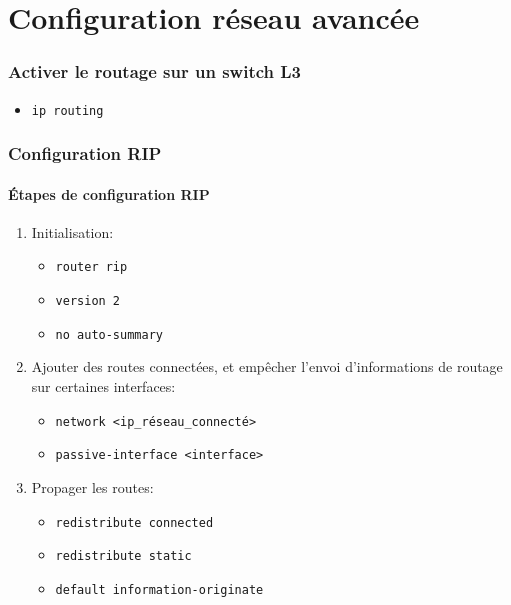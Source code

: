 \documentclass[a4paper]{article}
\begin{document}
\part{Configuration réseau avancée}










\section{Activer le routage sur un switch L3}



\begin{itemize}[label=\textbf{–}]
    \item \texttt{ip routing}
\end{itemize}










\section{Configuration RIP}





\subsection{Étapes de configuration RIP}



\begin{enumerate}
    \item Initialisation:
    \begin{itemize}[label=\textbf{–}]
        \item \texttt{router rip}
        \item \texttt{version 2}
        \item \texttt{no auto-summary}
    \end{itemize}
    \item Ajouter des routes connectées, et empêcher l'envoi d'informations de routage sur certaines interfaces:
    \begin{itemize}[label=\textbf{–}]
        \item \texttt{network <ip\_réseau\_connecté>}
        \item \texttt{passive-interface <interface>}
    \end{itemize}
    \item Propager les routes:
    \begin{itemize}[label=\textbf{–}]
        \item \texttt{redistribute connected}
        \item \texttt{redistribute static}
        \item \texttt{default information-originate}
    \end{itemize}
\end{enumerate}
\end{document}
